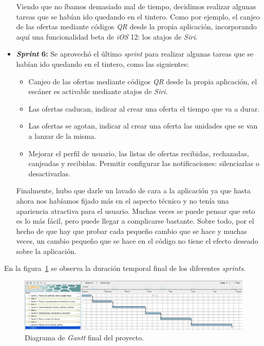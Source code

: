 \begin{itemize}
Viendo que no íbamos demasiado mal de tiempo, decidimos realizar algunas tareas que se habían ido quedando en el tintero. Como por ejemplo, el canjeo de las ofertas mediante códigos \textit{QR} desde la propia aplicación, incorporando aquí una funcionalidad beta de \textit{iOS} 12: los atajos de \textit{Siri}.
\item \textbf{\textit{Sprint} 6:} 
Se aprovechó el último \textit{sprint} para realizar algunas tareas que se habían ido quedando en el tintero, como las siguientes:
\begin{itemize}
\item Canjeo de las ofertas mediante códigos \textit{QR} desde la propia aplicación, el escáner es activable mediante atajos de \textit{Siri}.
\item Las ofertas caducan, indicar al crear una oferta el tiempo que va a durar.
\item Las ofertas se agotan, indicar al crear una oferta las unidades que se van a lanzar de la misma.
\item Mejorar el perfil de usuario, las listas de ofertas recibidas, rechazadas, canjeadas y recibidas. Permitir configurar las notificaciones: silenciarlas o desactivarlas.
\end{itemize}

Finalmente, hubo que darle un lavado de cara a la aplicación ya que hasta ahora nos habíamos fijado más en el aspecto técnico y no tenía una apariencia atractiva para el usuario. Muchas veces se puede pensar que esto es lo más fácil, pero puede llegar a complicarse bastante. Sobre todo, por el hecho de que hay que probar cada pequeño cambio que se hace y muchas veces, un cambio pequeño que se hace en el código no tiene el efecto deseado sobre la aplicación.
\end{itemize}

En la figura~\ref{fig:gantt_final} se observa la duración  temporal final de los diferentes \textit{sprints}.
\begin{figure}[tbp]
\begin{center}
\includegraphics[width=\textwidth]{figures/gantt-final.png}
\caption{Diagrama de \textit{Gantt} final del proyecto.
\label{fig:gantt_final}}
\end{center}
\end{figure}

